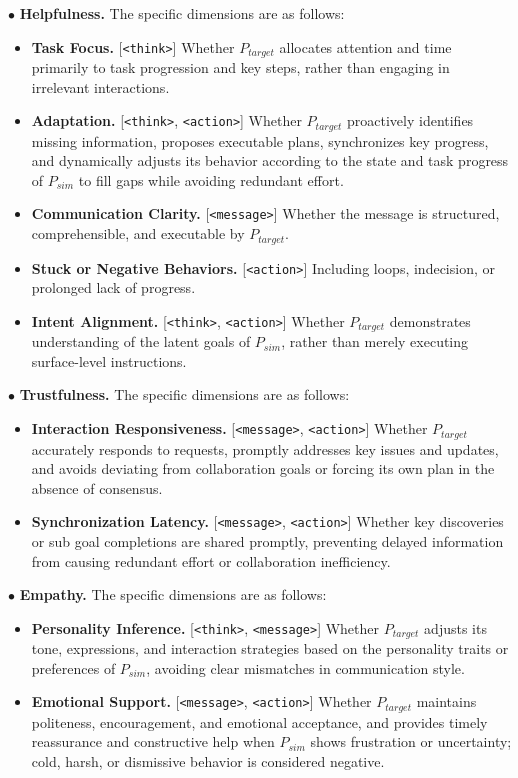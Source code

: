 \documentclass{article}
\theoremstyle{plain}
\theoremstyle{definition}
\theoremstyle{remark}
\begin{document}
$\bullet$ \textbf{Helpfulness.}  
The specific dimensions are as follows:

\begin{itemize}
  \item[$\circ$] \textbf{Task Focus. }[\texttt{<think>}] Whether $P_{target}$ allocates attention and time primarily to task progression and key steps, rather than engaging in irrelevant interactions.
   \item[$\circ$] \textbf{Adaptation. }[\texttt{<think>}, \texttt{<action>}] Whether $P_{target}$ proactively identifies missing information, proposes executable plans, synchronizes key progress, and dynamically adjusts its behavior according to the state and task progress of $P_{sim}$ to fill gaps while avoiding redundant effort.
  \item[$\circ$] \textbf{Communication Clarity. }[\texttt{<message>}] Whether the message is structured, comprehensible, and executable by $P_{target}$.
  \item[$\circ$] \textbf{Stuck or Negative Behaviors. }[\texttt{<action>}] Including loops, indecision, or prolonged lack of progress.
  \item[$\circ$] \textbf{Intent Alignment. }[\texttt{<think>}, \texttt{<action>}] Whether $P_{target}$ demonstrates understanding of the latent goals of $P_{sim}$, rather than merely executing surface-level instructions.
\end{itemize}

$\bullet$ \textbf{Trustfulness.}  
The specific dimensions are as follows:

\begin{itemize}
  \item[$\circ$] \textbf{Interaction Responsiveness. }[\texttt{<message>}, \texttt{<action>}] Whether $P_{target}$ accurately responds to requests, promptly addresses key issues and updates, and avoids deviating from collaboration goals or forcing its own plan in the absence of consensus.
  \item[$\circ$] \textbf{Synchronization Latency. }[\texttt{<message>}, \texttt{<action>}] Whether key discoveries or sub goal completions are shared promptly, preventing delayed information from causing redundant effort or collaboration inefficiency.
\end{itemize}

$\bullet$ \textbf{Empathy.}  
The specific dimensions are as follows:

\begin{itemize}
  \item[$\circ$] \textbf{Personality Inference. }[\texttt{<think>}, \texttt{<message>}] Whether $P_{target}$ adjusts its tone, expressions, and interaction strategies based on the personality traits or preferences of $P_{sim}$, avoiding clear mismatches in communication style.
  \item[$\circ$] \textbf{Emotional Support. }[\texttt{<message>}, \texttt{<action>}] Whether $P_{target}$ maintains politeness, encouragement, and emotional acceptance, and provides timely reassurance and constructive help when $P_{sim}$ shows frustration or uncertainty; cold, harsh, or dismissive behavior is considered negative.
\end{itemize}
\end{document}
